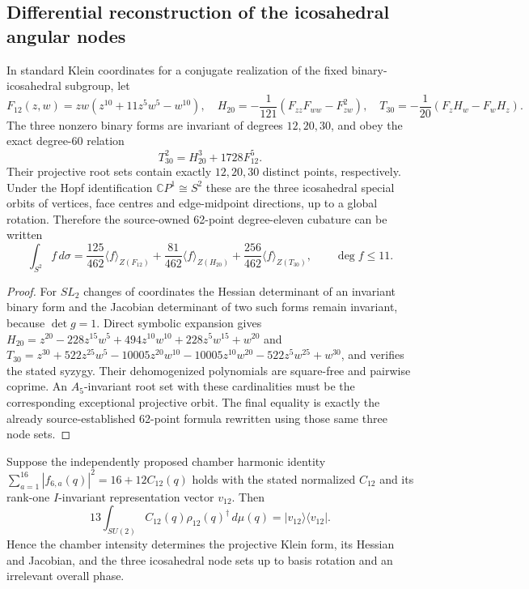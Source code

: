 \documentclass[11pt]{article}
\begin{document}
\subsection{Differential reconstruction of the icosahedral angular nodes}
\label{p1b:sec:cc111-klein-root}
\begin{theorem}
\label{p1b:thm:cc111-klein-root}
In standard Klein coordinates for a conjugate realization of the
fixed binary-icosahedral subgroup, let
\[
F_{12}(z,w)=zw(z^{10}+11z^5w^5-w^{10}),\quad
H_{20}=-\frac1{121}(F_{zz}F_{ww}-F_{zw}^2),
\quad T_{30}=-\frac1{20}(F_zH_w-F_wH_z).
\]
The three nonzero binary forms are invariant of degrees $12,20,30$,
and obey the exact degree-$60$ relation
\[ \boxed{T_{30}^2=H_{20}^3+1728F_{12}^5.} \]
Their projective root sets contain exactly $12,20,30$ distinct points,
respectively. Under the Hopf identification $\mathbb CP^1\cong S^2$
these are the three icosahedral special orbits of vertices, face centres
and edge-midpoint directions, up to a global rotation. Therefore the
source-owned 62-point degree-eleven cubature can be written
\[
\int_{S^2}f\,d\sigma=
\frac{125}{462}\langle f\rangle_{Z(F_{12})}+
\frac{81}{462}\langle f\rangle_{Z(H_{20})}+
\frac{256}{462}\langle f\rangle_{Z(T_{30})},
\qquad\deg f\le11.
\]
\end{theorem}
\begin{proof}
For $SL_2$ changes of coordinates the Hessian determinant of an
invariant binary form and the Jacobian determinant of two such forms
remain invariant, because $\det g=1$. Direct symbolic expansion gives
$H_{20}=z^{20}-228z^{15}w^5+494z^{10}w^{10}
+228z^5w^{15}+w^{20}$ and
$T_{30}=z^{30}+522z^{25}w^5-10005z^{20}w^{10}
-10005z^{10}w^{20}-522z^5w^{25}+w^{30}$,
and verifies the stated syzygy. Their dehomogenized polynomials are
square-free and pairwise coprime. An $A_5$-invariant root set with these
cardinalities must be the corresponding exceptional projective orbit.
The final equality is exactly the already source-established 62-point
formula rewritten using those same three node sets.
\end{proof}
\begin{corollary}
\label{p1b:cor:cc111-chamber-klein}
Suppose the independently proposed chamber harmonic identity
$\sum_{a=1}^{16}|f_{6,a}(q)|^2=16+12C_{12}(q)$ holds with the
stated normalized $C_{12}$ and its rank-one $I$-invariant representation
vector $v_{12}$. Then
\[
13\int_{SU(2)}C_{12}(q)\rho_{12}(q)^\dagger\,d\mu(q)
=|v_{12}\rangle\langle v_{12}|.
\]
Hence the chamber intensity determines the projective Klein form,
its Hessian and Jacobian, and the three icosahedral node sets up to
basis rotation and an irrelevant overall phase.
\end{corollary}
\end{document}
